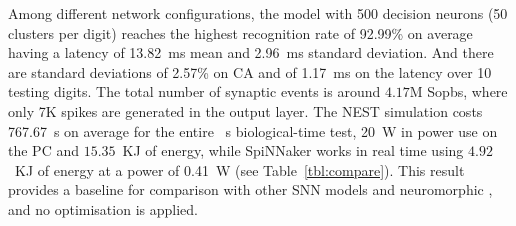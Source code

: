 Among different network configurations, the model with 500 decision neurons (50 clusters per digit) reaches the highest recognition rate of 92.99\% on average having a latency of 13.82~ms mean and 2.96~ms standard deviation.
And there are standard deviations of 2.57\% on CA and of 1.17~ms on the latency over 10 testing digits.
The total number of synaptic events is around $4.17$M Sopbs, where only 7K spikes are generated in the output layer. 
The NEST simulation costs 767.67~s on average for the entire \DIFdelbegin {}\DIFdelend \DIFaddbegin {}\DIFaddend ~s biological-time test, 20~W in power use on the PC and $15.35$~KJ of energy, while SpiNNaker works in real time using $4.92$~KJ of energy at a power of 0.41~W (see Table~\ref{tbl:compare}).
This result provides a baseline for comparison with other SNN models and neuromorphic \DIFdelbegin {}\DIFdelend \DIFaddbegin {}\DIFaddend , and no optimisation is applied.


